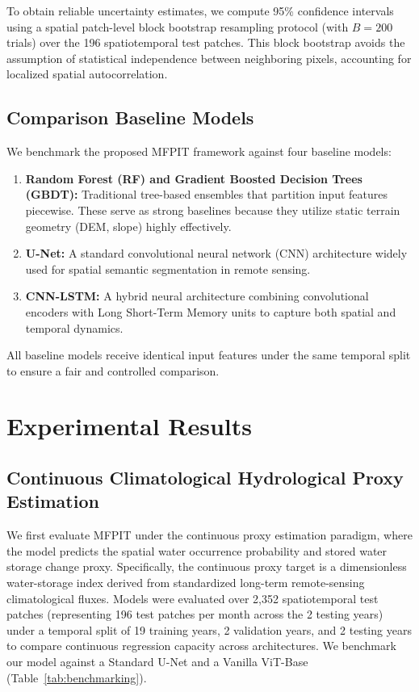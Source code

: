 \documentclass[preprint,12pt]{elsarticle}
\begin{document}
To obtain reliable uncertainty estimates, we compute 95\% confidence intervals using a spatial patch-level block bootstrap resampling protocol (with $B=200$ trials) over the 196 spatiotemporal test patches. This block bootstrap avoids the assumption of statistical independence between neighboring pixels, accounting for localized spatial autocorrelation.

\subsection{Comparison Baseline Models}
We benchmark the proposed MFPIT framework against four baseline models:
\begin{enumerate}
    \item \textbf{Random Forest (RF) and Gradient Boosted Decision Trees (GBDT):} Traditional tree-based ensembles that partition input features piecewise. These serve as strong baselines because they utilize static terrain geometry (DEM, slope) highly effectively.
    \item \textbf{U-Net:} A standard convolutional neural network (CNN) architecture widely used for spatial semantic segmentation in remote sensing.
    \item \textbf{CNN-LSTM:} A hybrid neural architecture combining convolutional encoders with Long Short-Term Memory units to capture both spatial and temporal dynamics.
\end{enumerate}
All baseline models receive identical input features under the same temporal split to ensure a fair and controlled comparison.

\section{Experimental Results}
\subsection{Continuous Climatological Hydrological Proxy Estimation}
We first evaluate MFPIT under the continuous proxy estimation paradigm, where the model predicts the spatial water occurrence probability and stored water storage change proxy. Specifically, the continuous proxy target is a dimensionless water-storage index derived from standardized long-term remote-sensing climatological fluxes. Models were evaluated over 2,352 spatiotemporal test patches (representing 196 test patches per month across the 2 testing years) under a temporal split of 19 training years, 2 validation years, and 2 testing years to compare continuous regression capacity across architectures. We benchmark our model against a Standard U-Net and a Vanilla ViT-Base (Table~\ref{tab:benchmarking}).
\end{document}
